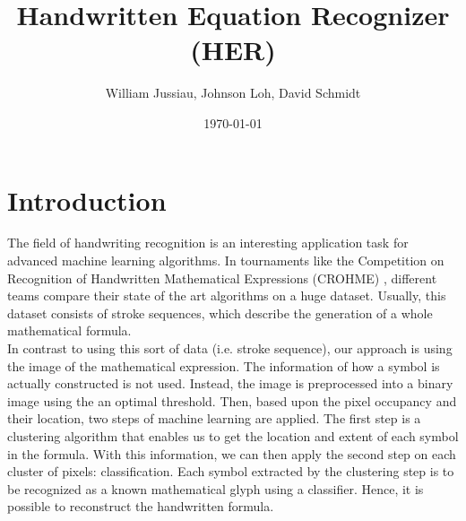 \documentclass[twocolumn]{article}%
\title{Handwritten Equation Recognizer (HER)}
\author{William Jussiau, Johnson Loh, David Schmidt}
\date{\today}
\begin{document}


 

	
	\section{Introduction}
		The field of handwriting recognition is an interesting application task for advanced machine learning algorithms. In tournaments like the Competition on Recognition of Handwritten Mathematical Expressions (CROHME) \cite{crohme}, different teams compare their state of the art algorithms on a huge dataset. Usually, this dataset consists of stroke sequences, which describe the generation of a whole mathematical formula.\\
		In contrast to using this sort of data (i.e. stroke sequence), our approach is using the image of the mathematical expression. The information of how a symbol is actually constructed is not used. Instead, the image is preprocessed into a binary image using the an optimal threshold. Then, based upon the pixel occupancy and their location, two steps of machine learning are applied. The first step is a clustering algorithm that enables us to get the location and extent of each symbol in the formula. With this information, we can then apply the second step on each cluster of pixels: classification. Each symbol extracted by the clustering step is to be recognized as a known mathematical glyph using a classifier.  Hence, it is possible to reconstruct the handwritten formula.
	    	    
\end{document}

